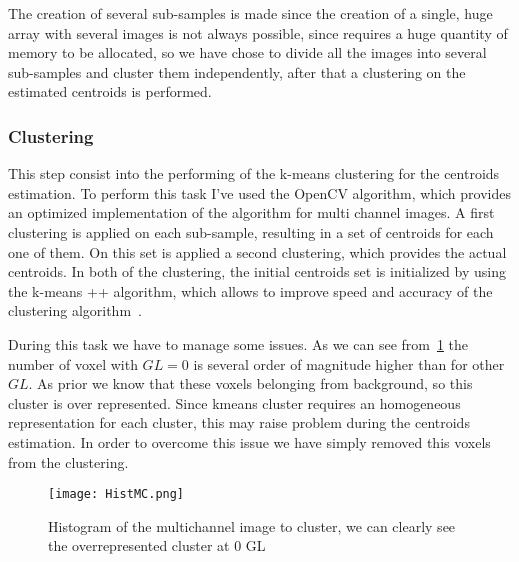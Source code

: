		
		The creation of several sub-samples is made since the creation of a single, huge array with several images is not always possible, since requires a huge quantity of memory to be allocated, so we have chose to divide all the images into several sub-samples and cluster them independently, after that a clustering on the estimated centroids is performed.\\

		
		\subsubsection*{Clustering} 
		
		This step consist into the performing of the k-means clustering for the centroids estimation. To perform this task I've used the OpenCV algorithm, which provides an optimized implementation of the algorithm for multi channel images. A first clustering is applied on each sub-sample, resulting in a set of centroids for each one of them. On this set is applied a second clustering, which provides the actual centroids. In both of the clustering, the initial centroids set is initialized by using the k-means ++ algorithm, which allows to improve speed and accuracy of the clustering algorithm~\cite{Arthur2007}.
		
		During this task we have to manage some issues. As we can see from \figurename\,\ref{fig:ClusteringHistogram} the number of voxel with $GL = 0$  is several order of magnitude higher than for other $GL$. As prior we know that these voxels belonging from background, so this cluster is over represented. Since kmeans cluster requires an homogeneous representation for each cluster, this may raise problem during the centroids estimation. In order to overcome this issue we have simply removed this voxels from the clustering.  
		

		\begin{figure}[h!]
			\centering
				\texttt{[image: HistMC.png]}
				\caption{Histogram of the multichannel image to cluster, we can clearly see the overrepresented cluster at $0$ GL}	\label{fig:ClusteringHistogram}
		\end{figure}
		
